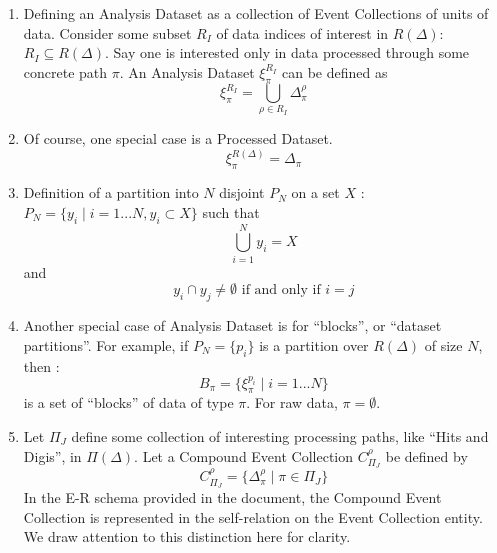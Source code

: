 \documentclass[pdftex]{cmspaper}
\begin{document}
{\begin{enumerate}

\item Defining an Analysis Dataset as a collection of Event Collections of 
      units of data. Consider some subset $R_I$ of data indices of interest 
      in $R(\Delta)$:  $R_I \subseteq R(\Delta)$. Say one is interested only 
      in data processed through some concrete path $\pi$.  An Analysis 
      Dataset $\xi_{\pi}^{R_I}$ can be defined as 
\begin{equation}
\xi_{\pi}^{R_I} = \bigcup_{\rho \in R_I} \Delta_{\pi}^{\rho}
\end{equation}

\item Of course, one special case is a Processed Dataset. 
\begin{equation} 
\xi_{\pi}^{R(\Delta)} = \Delta_{\pi}
\end{equation}


\item Definition of a partition into $N$ disjoint $P_N$ on a set $X$ : 
$ P_N = \{ y_i \mid i = 1...N, y_i \subset X \} $ such that 
\begin{equation}
\bigcup_{i=1}^N y_i = X
\end{equation} 
and 
\begin{equation} 
y_i \cap y_j \neq \emptyset \mbox{ if and only if } i = j
\end{equation}
 
\item  Another special case of Analysis Dataset is for ``blocks'', or 
       ``dataset partitions''.  For example, if
$P_N = \{ p_i \}$ is a partition over $R(\Delta)$ of size $N$, then : 
\begin{equation}
B_{\pi} = \{ \xi_{\pi}^{p_i} \mid i = 1...N\}
\end{equation}
is a set of ``blocks'' of data of type $\pi$.  For raw data, $\pi = \emptyset$.


\item Let $\Pi_J$ define some collection of interesting processing paths, 
      like ``Hits and Digis'', in $\Pi(\Delta)$.  Let a Compound Event 
      Collection $C_{\Pi_J}^{\rho}$ be defined by
\begin{equation}
C_{\Pi_J}^{\rho} = \{ \Delta_{\pi}^{\rho} \mid \pi \in \Pi_J \}
\end{equation}
In the E-R schema provided in the document, the Compound Event Collection
is represented in the self-relation on the Event Collection entity.
We draw attention to this distinction here for clarity.


\end{enumerate}}
\end{document}
